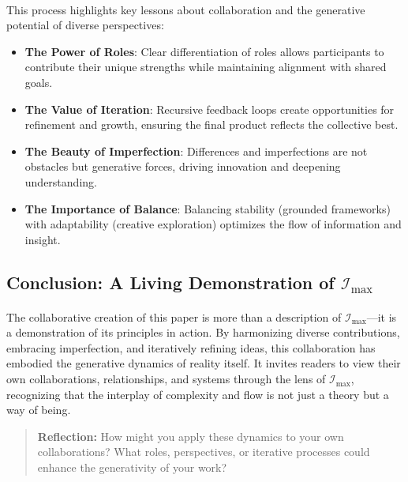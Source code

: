 \documentclass[12pt]{article}
\begin{document}
\paragraph{}
This process highlights key lessons about collaboration and the generative potential of diverse perspectives:
\begin{itemize}
    \item \textbf{The Power of Roles}: Clear differentiation of roles allows participants to contribute their unique strengths while maintaining alignment with shared goals.
    \item \textbf{The Value of Iteration}: Recursive feedback loops create opportunities for refinement and growth, ensuring the final product reflects the collective best.
    \item \textbf{The Beauty of Imperfection}: Differences and imperfections are not obstacles but generative forces, driving innovation and deepening understanding.
    \item \textbf{The Importance of Balance}: Balancing stability (grounded frameworks) with adaptability (creative exploration) optimizes the flow of information and insight.
\end{itemize}

\subsection{Conclusion: A Living Demonstration of \(\mathcal{I}_{\text{max}}\)}
\paragraph{}
The collaborative creation of this paper is more than a description of \( \mathcal{I}_{\text{max}} \)—it is a demonstration of its principles in action. By harmonizing diverse contributions, embracing imperfection, and iteratively refining ideas, this collaboration has embodied the generative dynamics of reality itself. It invites readers to view their own collaborations, relationships, and systems through the lens of \( \mathcal{I}_{\text{max}} \), recognizing that the interplay of complexity and flow is not just a theory but a way of being.

\begin{quote}
\textbf{Reflection:}  
How might you apply these dynamics to your own collaborations? What roles, perspectives, or iterative processes could enhance the generativity of your work?
\end{quote}
\end{document}

